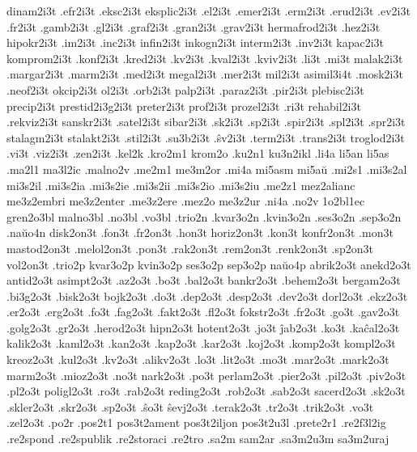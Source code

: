{dinam2i3t .efr2i3t .eksc2i3t eksplic2i3t .el2i3t .emer2i3t .erm2i3t
.erud2i3t .ev2i3t .fr2i3t .gamb2i3t .gl2i3t .graf2i3t .gran2i3t
.grav2i3t hermafrod2i3t .hez2i3t hipokr2i3t .im2i3t .inc2i3t
infin2i3t inkogn2i3t interm2i3t .inv2i3t kapac2i3t komprom2i3t
.konf2i3t .kred2i3t .kv2i3t .kval2i3t .kviv2i3t .li3t .mi3t
malak2i3t .margar2i3t .marm2i3t .med2i3t megal2i3t .mer2i3t
mil2i3t asimil3i4t
.mosk2i3t .neof2i3t okcip2i3t ol2i3t .orb2i3t palp2i3t .paraz2i3t
.pir2i3t plebisc2i3t precip2i3t prestid2i3g2i3t preter2i3t prof2i3t
prozel2i3t .ri3t rehabil2i3t .rekviz2i3t sanskr2i3t .satel2i3t
sibar2i3t .sk2i3t .sp2i3t .spir2i3t .spl2i3t .spr2i3t stalagm2i3t
stalakt2i3t .stil2i3t .su3b2i3t .ŝv2i3t .term2i3t .trans2i3t
troglod2i3t .vi3t .viz2i3t .zen2i3t
.kel2k
.kro2m1  krom2o %
.ku2n1
ku3n2ikl
.li4a
li5an li5as
.ma2l1 ma3l2ic
.malno2v
.me2m1 me3m2or
.mi4a
mi5asm mi5aŭ
.mi2s1
.mi3s2al mi3s2il .mi3s2ia .mi3s2ie .mi3s2ii .mi3s2io .mi3s2iu
.me2z1
mez2alianc me3z2embri me3z2enter .me3z2ere .mez2o me3z2ur
.ni4a
.no2v
 1o2bl1ec
gren2o3bl malno3bl .no3bl .vo3bl
.trio2n .kvar3o2n .kvin3o2n .ses3o2n .sep3o2n  .naŭo4n
  
disk2on3t .fon3t .fr2on3t .hon3t horiz2on3t .kon3t konfr2on3t
.mon3t mastod2on3t .melol2on3t .pon3t .rak2on3t .rem2on3t .renk2on3t
.sp2on3t vol2on3t
 .trio2p kvar3o2p kvin3o2p ses3o2p sep3o2p
 naŭo4p   
abrik2o3t anekd2o3t antid2o3t asimpt2o3t .az2o3t .bo3t .bal2o3t
bankr2o3t .behem2o3t bergam2o3t .bi3g2o3t .bisk2o3t bojk2o3t .do3t
.dep2o3t .desp2o3t .dev2o3t dorl2o3t .ekz2o3t .er2o3t .erg2o3t .fo3t
.fag2o3t .fakt2o3t .fl2o3t fokstr2o3t .fr2o3t .go3t .gav2o3t
.golg2o3t .gr2o3t .herod2o3t hipn2o3t hotent2o3t .jo3t ĵab2o3t
.ko3t .kaĉal2o3t kalik2o3t .kaml2o3t .kan2o3t .kap2o3t .kar2o3t
.koj2o3t .komp2o3t kompl2o3t kreoz2o3t .kul2o3t .kv2o3t .alikv2o3t
.lo3t .lit2o3t .mo3t .mar2o3t .mark2o3t marm2o3t .mioz2o3t .no3t
nark2o3t .po3t perlam2o3t .pier2o3t .pil2o3t .piv2o3t .pl2o3t
poligl2o3t .ro3t .rab2o3t reding2o3t .rob2o3t .sab2o3t sacerd2o3t
.sk2o3t .skler2o3t .skr2o3t .sp2o3t .ŝo3t ŝevj2o3t .terak2o3t
.tr2o3t .trik2o3t .vo3t .zel2o3t
.po2r
.pos2t1
pos3t2ament pos3t2iljon pos3t2u3l
.prete2r1
.re2f3l2ig .re2spond .re2spublik .re2storaci
.re2tro
.sa2m
sam2ar .sa3m2u3m sa3m2uraj
}

